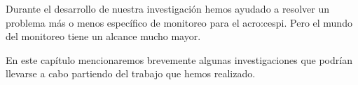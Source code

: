 Durante el desarrollo de nuestra investigación hemos ayudado a resolver un
problema más o menos específico de monitoreo para el \gls{acro:cespi}.
Pero el mundo del monitoreo tiene un alcance mucho mayor.

En este capítulo mencionaremos brevemente algunas investigaciones que podrían
llevarse a cabo partiendo del trabajo que hemos realizado.
